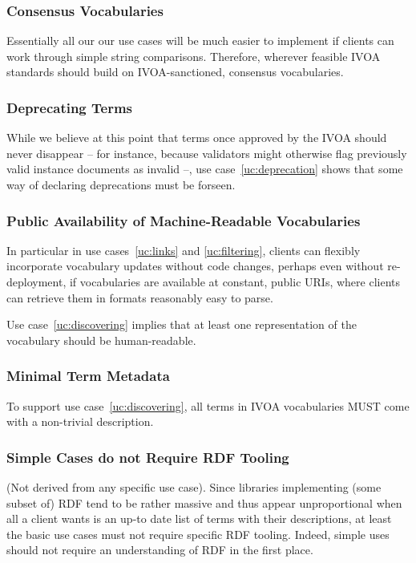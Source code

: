 \documentclass[11pt,a4paper]{ivoa}
\begin{document}
\subsubsection{Consensus Vocabularies}
\label{req:consensus}

Essentially all our our use cases will be much easier to implement if
clients can work through simple string comparisons.  Therefore,
wherever feasible IVOA standards should build on IVOA-sanctioned,
consensus vocabularies.

\subsubsection{Deprecating Terms}
\label{req:deprecating}

While we believe at this point that terms once approved by the IVOA
should never disappear -- for instance, because validators might
otherwise flag previously valid instance documents as invalid --, use
case~\ref{uc:deprecation} shows that some way of declaring
deprecations must be forseen.

\subsubsection{Public Availability of Machine-Readable Vocabularies}
\label{req:machine}

In particular in use cases~\ref{uc:links} and \ref{uc:filtering},
clients can flexibly incorporate vocabulary updates without code
changes, perhaps even without re-deployment, if vocabularies are
available at constant, public URIs, where clients can retrieve them in
formats reasonably easy to parse.

Use case~\ref{uc:discovering} implies that at least one representation
of the vocabulary should be human-readable.

\subsubsection{Minimal Term Metadata}
\label{req:mtm}

To support use case~\ref{uc:discovering}, all terms in IVOA vocabularies
MUST come with a non-trivial description.

\subsubsection{Simple Cases do not Require RDF Tooling}
\label{req:nordf}

(Not derived from any specific use case).  Since libraries implementing
(some subset of) RDF tend to be rather massive and thus appear
unproportional when all a client wants is an up-to date list of terms
with their descriptions, at least the basic use cases must not require
specific RDF tooling.  Indeed, simple uses should not require an
understanding of RDF in the first place.
\end{document}
